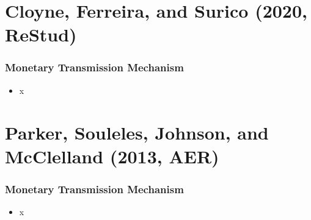 \documentclass[english,xcolor=svgnames]{beamer}
\begin{document}
%


\section{Cloyne, Ferreira, and Surico (2020, ReStud)}

\begin{frame}
\frametitle[alignment=center]{Monetary Transmission Mechanism}
\begin{itemize}
	\item x
\end{itemize}
\end{frame}


\section{Parker, Souleles, Johnson, and McClelland (2013, AER)}

\begin{frame}
\frametitle[alignment=center]{Monetary Transmission Mechanism}
\begin{itemize}
	\item x
\end{itemize}
\end{frame}
\end{document}
